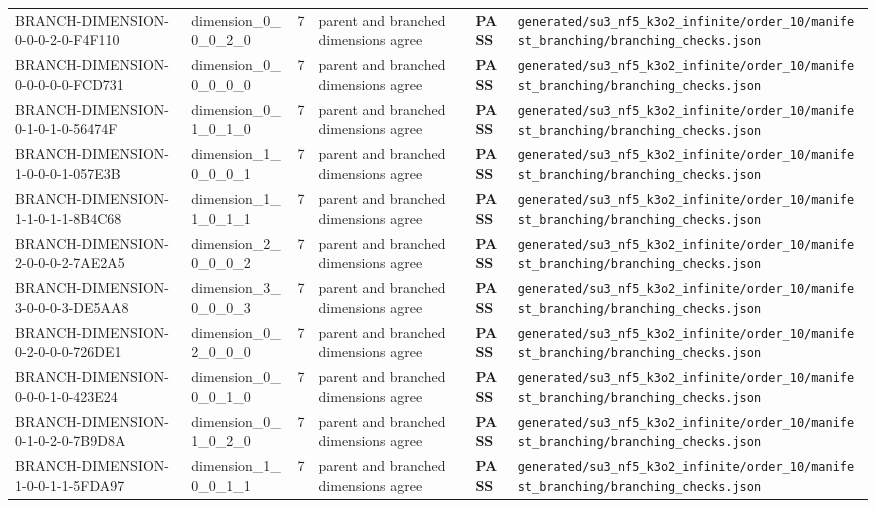 \documentclass[11pt]{article}
\newcommand{\Pass}{\textcolor{green!50!black}{\textbf{PASS}}}
\newcommand{\RawPath}[1]{\texttt{#1}}
\begin{document}
\begin{longtable}{p{3cm}p{2.5cm}r p{3cm}l p{2cm}}
BRANCH-DIMENSION-0-0-0-2-0-F4F110 & dimension\_0\_0\_0\_2\_0 & 7 & parent and branched dimensions agree & \Pass & \RawPath{generated/su3\_nf5\_k3o2\_infinite/order\_10/manifest\_branching/branching\_checks.json}\\
BRANCH-DIMENSION-0-0-0-0-0-FCD731 & dimension\_0\_0\_0\_0\_0 & 7 & parent and branched dimensions agree & \Pass & \RawPath{generated/su3\_nf5\_k3o2\_infinite/order\_10/manifest\_branching/branching\_checks.json}\\
BRANCH-DIMENSION-0-1-0-1-0-56474F & dimension\_0\_1\_0\_1\_0 & 7 & parent and branched dimensions agree & \Pass & \RawPath{generated/su3\_nf5\_k3o2\_infinite/order\_10/manifest\_branching/branching\_checks.json}\\
BRANCH-DIMENSION-1-0-0-0-1-057E3B & dimension\_1\_0\_0\_0\_1 & 7 & parent and branched dimensions agree & \Pass & \RawPath{generated/su3\_nf5\_k3o2\_infinite/order\_10/manifest\_branching/branching\_checks.json}\\
BRANCH-DIMENSION-1-1-0-1-1-8B4C68 & dimension\_1\_1\_0\_1\_1 & 7 & parent and branched dimensions agree & \Pass & \RawPath{generated/su3\_nf5\_k3o2\_infinite/order\_10/manifest\_branching/branching\_checks.json}\\
BRANCH-DIMENSION-2-0-0-0-2-7AE2A5 & dimension\_2\_0\_0\_0\_2 & 7 & parent and branched dimensions agree & \Pass & \RawPath{generated/su3\_nf5\_k3o2\_infinite/order\_10/manifest\_branching/branching\_checks.json}\\
BRANCH-DIMENSION-3-0-0-0-3-DE5AA8 & dimension\_3\_0\_0\_0\_3 & 7 & parent and branched dimensions agree & \Pass & \RawPath{generated/su3\_nf5\_k3o2\_infinite/order\_10/manifest\_branching/branching\_checks.json}\\
BRANCH-DIMENSION-0-2-0-0-0-726DE1 & dimension\_0\_2\_0\_0\_0 & 7 & parent and branched dimensions agree & \Pass & \RawPath{generated/su3\_nf5\_k3o2\_infinite/order\_10/manifest\_branching/branching\_checks.json}\\
BRANCH-DIMENSION-0-0-0-1-0-423E24 & dimension\_0\_0\_0\_1\_0 & 7 & parent and branched dimensions agree & \Pass & \RawPath{generated/su3\_nf5\_k3o2\_infinite/order\_10/manifest\_branching/branching\_checks.json}\\
BRANCH-DIMENSION-0-1-0-2-0-7B9D8A & dimension\_0\_1\_0\_2\_0 & 7 & parent and branched dimensions agree & \Pass & \RawPath{generated/su3\_nf5\_k3o2\_infinite/order\_10/manifest\_branching/branching\_checks.json}\\
BRANCH-DIMENSION-1-0-0-1-1-5FDA97 & dimension\_1\_0\_0\_1\_1 & 7 & parent and branched dimensions agree & \Pass & \RawPath{generated/su3\_nf5\_k3o2\_infinite/order\_10/manifest\_branching/branching\_checks.json}\\

\end{longtable}
\end{document}
